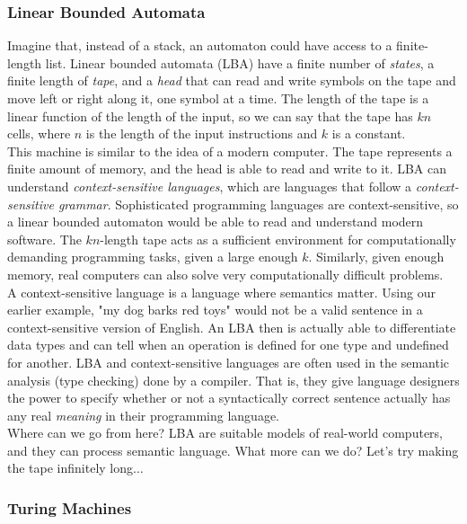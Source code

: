 \subsubsection{Linear Bounded Automata}

Imagine that, instead of a stack, an automaton could have access to a finite-length list. Linear bounded automata (LBA) have a finite number of \textit{states}, a finite length of \textit{tape}, and a \textit{head} that can read and write symbols on the tape and move left or right along it, one symbol at a time. The length of the tape is a linear function of the length of the input, so we can say that the tape has $kn$ cells, where $n$ is the length of the input instructions and $k$ is a constant. \\

This machine is similar to the idea of a modern computer. The tape represents a finite amount of memory, and the head is able to read and write to it. LBA can understand \textit{context-sensitive languages}, which are languages that follow a \textit{context-sensitive grammar}. Sophisticated programming languages are context-sensitive, so a linear bounded automaton would be able to read and understand modern software. The $kn$-length tape acts as a sufficient environment for computationally demanding programming tasks, given a large enough $k$. Similarly, given enough memory, real computers can also solve very computationally difficult problems. \\

A context-sensitive language is a language where semantics matter. Using our earlier example, "my dog barks red toys" would not be a valid sentence in a context-sensitive version of English. An LBA then is actually able to differentiate data types and can tell when an operation is defined for one type and undefined for another. LBA and context-sensitive languages are often used in the semantic analysis (type checking) done by a compiler. That is, they give language designers the power to specify whether or not a syntactically correct sentence actually has any real \textit{meaning} in their programming language. \\

Where can we go from here? LBA are suitable models of real-world computers, and they can process semantic language. What more can we do? Let's try making the tape infinitely long$\dots$ \\

\subsubsection{Turing Machines}

